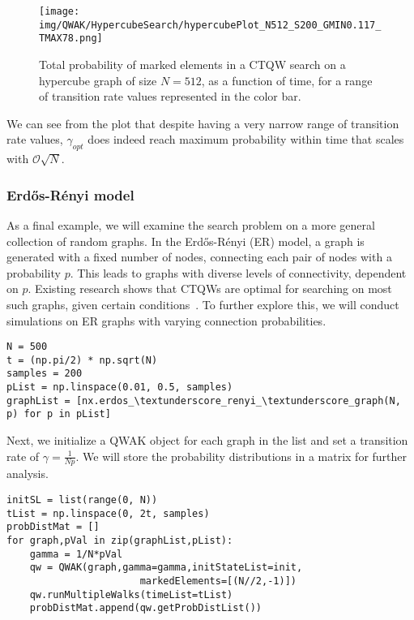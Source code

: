 \documentclass[main.tex]{subfiles}
\begin{document}
\begin{figure}[!h]
    \centering
    \texttt{[image: img/QWAK/HypercubeSearch/hypercubePlot\_N512\_S200\_GMIN0.117\_TMAX78.png]}
    \caption{Total probability of marked elements in a CTQW search on a hypercube
    graph of size $N=512$, as a function of time, for a range of transition
    rate values represented in the color bar.} 
    \label{fig:hypercubeSearch}
\end{figure}

We can see from the plot that despite having a very narrow range of transition
rate values, $\gamma_{opt}$ does indeed reach maximum probability within time
that scales with $\mathcal{O}\sqrt{N}$.

\subsubsection{Erdős-Rényi model}

As a final example, we will examine the search problem on a more general
collection of random graphs. In the Erdős-Rényi (ER) model, a graph is
generated with a fixed number of nodes, connecting each pair of nodes with a
probability $p$. This leads to graphs with diverse levels of connectivity,
dependent on $p$. Existing research shows that CTQWs are optimal for
searching on most such graphs, given certain conditions~\cite{chakraborty2016}.
To further explore this, we will conduct simulations on ER graphs with varying
connection probabilities.

\begin{lstlisting}[style=code,escapeinside={__}]
N = 500
t = (np.pi/2) * np.sqrt(N)
samples = 200
pList = np.linspace(0.01, 0.5, samples)
graphList = [nx.erdos_\textunderscore_renyi_\textunderscore_graph(N, p) for p in pList]
\end{lstlisting}


Next, we initialize a QWAK object for each graph in the list and set a
transition rate of $\gamma = \frac{1}{N p}$. We will store the probability
distributions in a matrix for further analysis.

\begin{lstlisting}[style=code,escapeinside={__}]
initSL = list(range(0, N))
tList = np.linspace(0, 2t, samples)
probDistMat = []
for graph,pVal in zip(graphList,pList):
    gamma = 1/N*pVal
    qw = QWAK(graph,gamma=gamma,initStateList=init,
                       markedElements=[(N//2,-1)])
    qw.runMultipleWalks(timeList=tList)
    probDistMat.append(qw.getProbDistList())
\end{lstlisting}
\end{document}
